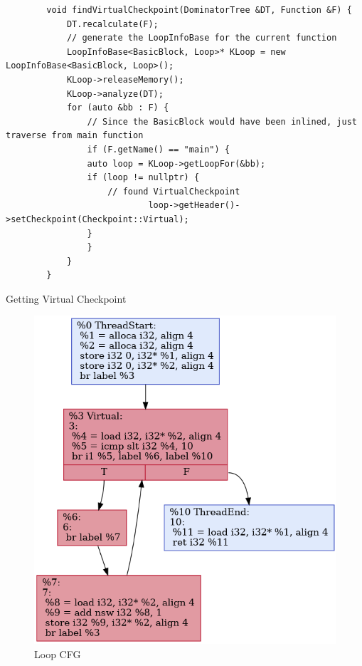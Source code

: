 \begin{listing}[htbp]
    \begin{verbatim}
        void findVirtualCheckpoint(DominatorTree &DT, Function &F) {
            DT.recalculate(F);
            // generate the LoopInfoBase for the current function
            LoopInfoBase<BasicBlock, Loop>* KLoop = new LoopInfoBase<BasicBlock, Loop>();
            KLoop->releaseMemory();
            KLoop->analyze(DT);
            for (auto &bb : F) {
                // Since the BasicBlock would have been inlined, just traverse from main function
                if (F.getName() == "main") {
                auto loop = KLoop->getLoopFor(&bb);
                if (loop != nullptr) {
                    // found VirtualCheckpoint
                            loop->getHeader()->setCheckpoint(Checkpoint::Virtual);
                }
                }
            }
        }
    \end{verbatim}
    \caption{Getting Virtual Checkpoint}
    \label{listing:virtual-cp}
\end{listing}



\begin{figure}[htbp]
\centerline{\includegraphics[scale=.70]{Figures/04/simple-loop-checkpoints.png}}
\caption{Loop CFG}
\label{fig:simple-loop-checkpoints}
\end{figure}

